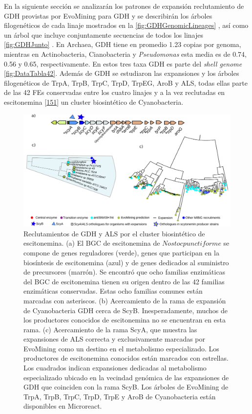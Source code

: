 \documentclass[12pt,twoside]{reedthesis}
\begin{document}
  En la siguiente sección se analizarán los patrones de expansión
  reclutamiento de GDH provistas por EvoMining para GDH y se describirán
  los árboles filogenéticos de cada linaje mostrados en la
  \autoref{fig:GDHGenomicLineages} , así como un árbol que incluye
  conjuntamente secuencias de todos los linajes \autoref{fig:GDHJunto} .
  En Archaea, GDH tiene en promedio 1.23 copias por genoma, mientras en
  Actinobacteria, Cianobacteria y \emph{Pseudomonas} esta media es de
  0.74, 0.56 y 0.65, respectivamente. En estos tres taxa GDH es parte del
  \emph{shell genome} \autoref{fig:DataTabla42}. Además de GDH se
  estudiaron las expansiones y los árboles filogenéticos de TrpA, TrpB,
  TrpC, TrpD, TrpEG, AroB y ALS, todas ellas parte de las 42 FEs
  conservadas entre los cuatro linajes y a la vez reclutadas en
  escitonemina
  {[}\protect\hyperlink{ref-balskus_investigating_2008}{151}{]} un cluster
  biosintético de Cyanobacteria.
  
  \begin{figure}[h!tbp]
  \centering
  \includegraphics[angle = 0,scale = .6]{chapter2/FigurasPaper/Figure5.pdf}
  \caption[Escitonemina es un reclutamiento en las ramas divergentes de las familias GDH y ALS]{\footnotesize{Reclutamientos de GDH y ALS por el cluster biosintético de escitonemina. (a) El BGC de  escitonemina de $Nostoc punctiforme$ se compone de genes reguladores (verde), genes que participan en la biosíntesis de escitonemina (azul) y de genes dedicados al suministro de precursores (marrón). Se encontró que ocho familias enzimáticas del BGC de escitonemina tienen su origen dentro de las 42 familias enzimáticas conservadas. Estas ocho familias comunes están marcadas con asteriscos. (b) Acercamiento de la rama de expansión de Cyanobacteria GDH cerca de ScyB. Inesperadamente, muchos de los productores conocidos de escitonemina no se encuentran en esta rama. (c) Acercamiento de la rama ScyA, que muestra las expansiones de ALS correcta y exclusivamente marcadas por EvoMining como un destino en el metabolismo especializado. Los productores de escitonemina conocidos están marcados con estrellas. Los cuadrados indican expansiones dedicadas al metabolismo especializado ubicado en la vecindad genómica de las expansiones de GDH que coinciden con la rama ScyB. Los árboles de EvoMining de TrpA, TrpB, TrpC, TrpD, TrpE y AroB de Cyanobacteria están disponibles en Microreact.}}
  \label{fig:Scytonemin}
  \end{figure}
  
\end{document}
